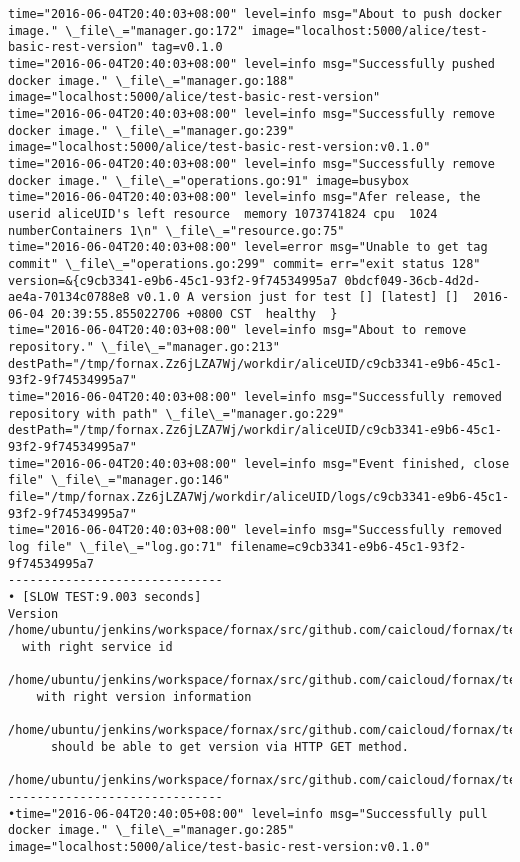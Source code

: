 \begin{lstlisting}[caption={Fornax功能性测试日志}]
time="2016-06-04T20:40:03+08:00" level=info msg="About to push docker image." \_file\_="manager.go:172" image="localhost:5000/alice/test-basic-rest-version" tag=v0.1.0 
time="2016-06-04T20:40:03+08:00" level=info msg="Successfully pushed docker image." \_file\_="manager.go:188" image="localhost:5000/alice/test-basic-rest-version" 
time="2016-06-04T20:40:03+08:00" level=info msg="Successfully remove docker image." \_file\_="manager.go:239" image="localhost:5000/alice/test-basic-rest-version:v0.1.0" 
time="2016-06-04T20:40:03+08:00" level=info msg="Successfully remove docker image." \_file\_="operations.go:91" image=busybox 
time="2016-06-04T20:40:03+08:00" level=info msg="Afer release, the userid aliceUID's left resource  memory 1073741824 cpu  1024 numberContainers 1\n" \_file\_="resource.go:75" 
time="2016-06-04T20:40:03+08:00" level=error msg="Unable to get tag commit" \_file\_="operations.go:299" commit= err="exit status 128" version=&{c9cb3341-e9b6-45c1-93f2-9f74534995a7 0bdcf049-36cb-4d2d-ae4a-70134c0788e8 v0.1.0 A version just for test [] [latest] []  2016-06-04 20:39:55.855022706 +0800 CST  healthy  } 
time="2016-06-04T20:40:03+08:00" level=info msg="About to remove repository." \_file\_="manager.go:213" destPath="/tmp/fornax.Zz6jLZA7Wj/workdir/aliceUID/c9cb3341-e9b6-45c1-93f2-9f74534995a7" 
time="2016-06-04T20:40:03+08:00" level=info msg="Successfully removed repository with path" \_file\_="manager.go:229" destPath="/tmp/fornax.Zz6jLZA7Wj/workdir/aliceUID/c9cb3341-e9b6-45c1-93f2-9f74534995a7" 
time="2016-06-04T20:40:03+08:00" level=info msg="Event finished, close file" \_file\_="manager.go:146" file="/tmp/fornax.Zz6jLZA7Wj/workdir/aliceUID/logs/c9cb3341-e9b6-45c1-93f2-9f74534995a7" 
time="2016-06-04T20:40:03+08:00" level=info msg="Successfully removed log file" \_file\_="log.go:71" filename=c9cb3341-e9b6-45c1-93f2-9f74534995a7 
------------------------------
• [SLOW TEST:9.003 seconds]
Version
/home/ubuntu/jenkins/workspace/fornax/src/github.com/caicloud/fornax/tests/version/version\_test.go:374
  with right service id
  /home/ubuntu/jenkins/workspace/fornax/src/github.com/caicloud/fornax/tests/version/version\_test.go:206
    with right version information
    /home/ubuntu/jenkins/workspace/fornax/src/github.com/caicloud/fornax/tests/version/version\_test.go:197
      should be able to get version via HTTP GET method.
      /home/ubuntu/jenkins/workspace/fornax/src/github.com/caicloud/fornax/tests/version/version\_test.go:156
------------------------------
•time="2016-06-04T20:40:05+08:00" level=info msg="Successfully pull docker image." \_file\_="manager.go:285" image="localhost:5000/alice/test-basic-rest-version:v0.1.0" 

\end{lstlisting}
